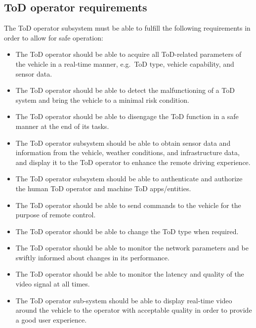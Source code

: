 \subsection{ToD operator requirements}
The ToD operator subsystem must be able to fulfill the following requirements in order to allow for safe operation:
\begin{itemize}
    \item The ToD operator should be able to acquire all ToD-related parameters of the vehicle in a real-time manner, e.g.\ ToD type, vehicle capability, and sensor data.
    \item The ToD operator should be able to detect the malfunctioning of a ToD system and bring the vehicle to a minimal risk condition.
    \item The ToD operator should be able to disengage the ToD function in a safe manner at the end of its tasks.
    \item The ToD operator subsystem should be able to obtain sensor data and information from the vehicle, weather conditions, and infrastructure data, and display it to the ToD operator to enhance the remote driving experience.
    \item The ToD operator subsystem should be able to authenticate and authorize the human ToD operator and machine ToD apps/entities.
    \item The ToD operator should be able to send commands to the vehicle for the purpose of remote control.
    \item The ToD operator should be able to change the ToD type when required.
    \item The ToD operator should be able to monitor the network parameters and be swiftly informed about changes in its performance.
    \item The ToD operator should be able to monitor the latency and quality of the video signal at all times.
    \item The ToD operator sub-system should be able to display real-time video around the vehicle to the operator with acceptable quality in order to provide a good user experience.
\end{itemize}


